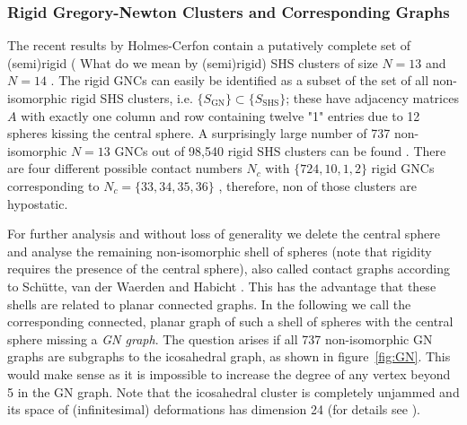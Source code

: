 \subsubsection{Rigid Gregory-Newton Clusters and Corresponding Graphs}

The recent results by Holmes-Cerfon contain a putatively complete set of
(semi)rigid {(\color{red} What do we mean by (semi)rigid)} SHS clusters of size $N=13$ and $N=14$
\autocite{Holmes-Cerfon_EnumeratingRigidSphere_2016}. The rigid GNCs can easily be
identified as a subset of the set of all non-isomorphic rigid SHS clusters,
i.e. $\{ S_\mathrm{GN}\}\subset \{ S_\mathrm{SHS}\}$; these have adjacency matrices
$A$ with exactly one column and row containing twelve "1" entries due to 12
spheres kissing the central sphere. A surprisingly large number of 737
non-isomorphic $N = 13$ GNCs out of 98,540 rigid SHS clusters can be found
\autocite{Trombach_stickyhardsphereLennardJonestypeclusters_2018}. There are four different possible contact numbers $N_c$
with $\{724,10,1,2\}$ rigid GNCs corresponding to $N_c=\{33,34,35,36\}$
\autocite{Robinson_Arrangement24points_1961}, therefore, non of those clusters are hypostatic.

For further analysis and without loss of generality we delete the central
sphere and analyse the remaining non-isomorphic shell of spheres (note that
rigidity requires the presence of the central sphere), also called contact
graphs according to Sch{\"u}tte, van der Waerden and Habicht
\autocite{Schuette_AufwelcherKugel_1951}. This has the advantage that these shells are related to
planar connected graphs. In the following we call the corresponding connected,
planar graph of such a shell of spheres with the central sphere missing a
\textit{GN graph}. The question arises if all 737 non-isomorphic GN graphs are
subgraphs to the icosahedral graph, as shown in figure~\ref{fig:GN}. This would
make sense as it is impossible to increase the degree of any vertex beyond 5 in
the GN graph. Note that the icosahedral cluster is completely unjammed and its
space of (infinitesimal) deformations has dimension 24 (for details see
\citeauthor{Kusner_ConfigurationSpacesEqual_2016}\autocite{Kusner_ConfigurationSpacesEqual_2016}).

